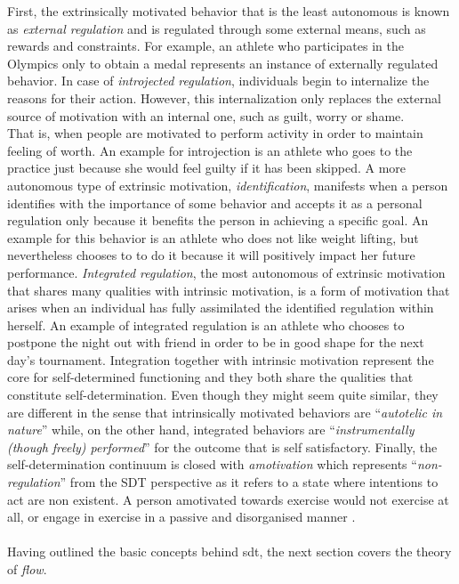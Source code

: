 First, the extrinsically motivated behavior that is the least autonomous is known as \textit{external regulation} and is regulated through some external means, such as rewards and constraints. For example, an athlete who participates in the Olympics only to obtain a medal represents an instance of externally regulated behavior. In case of \textit{introjected regulation}, individuals begin to internalize the reasons for their action. However, this internalization only replaces the external source of motivation with an internal one, such as guilt, worry or shame.\\That is, when people are motivated to perform activity in order to maintain feeling of worth. An example for introjection is an athlete who goes to the practice just because she would feel guilty if it has been skipped. A more autonomous type of extrinsic motivation, \textit{identification}, manifests when a person identifies with the importance of some behavior and accepts it as a personal regulation only because it benefits the person in achieving a specific goal. An example for this behavior is an athlete who does not like weight lifting, but nevertheless chooses to to do it because it will positively impact her future performance. \textit{Integrated regulation}, the most autonomous of extrinsic motivation that shares many qualities with intrinsic motivation, is a form of motivation that arises when an individual has fully assimilated the identified regulation within herself. An example of integrated regulation is an athlete who chooses to postpone the night out with friend in order to be in good shape for the next day's tournament. Integration together with intrinsic motivation represent the core for self-determined functioning and they both share the qualities that constitute self-determination. Even though they might seem quite similar, they are different in the sense that intrinsically motivated behaviors are ``\textit{autotelic in nature}'' while, on the other hand, integrated behaviors are ``\textit{instrumentally (though freely) performed}'' for the outcome that is self satisfactory.  Finally, the self-determination continuum is closed with  \textit{amotivation} which represents ``\textit{non-regulation}'' from the SDT perspective as it refers to a state where intentions to act are non existent. A person amotivated towards exercise would not exercise at all, 
or engage in exercise in a passive and disorganised  manner \cite{deci1994promoting, ryan2000intrinsic, vallerand2007intrinsic}.\\\\
Having outlined the basic concepts behind \acrshort{sdt}, the next section covers the theory of \textit{flow}.
